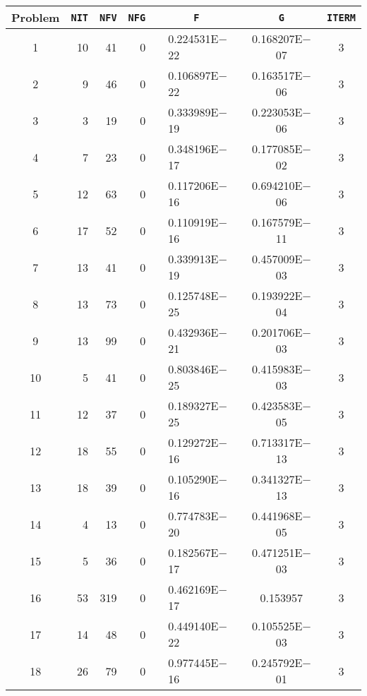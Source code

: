 \documentclass{esub2acm}
\begin{document}
\begin{table}
\footnotesize
\centering
\begin{tabular}{c|rrrr@{}lcc} \hline
Problem\rule[-2pt]{0pt}{12pt} & {\tt NIT} & {\tt NFV} & {\tt NFG} & \multicolumn{2}{c}{\tt F} & {\tt G} & {\tt ITERM} \\ \hline
1\rule[-2pt]{0pt}{12pt} &   10  &   41  &   0   &       &   0.224531E$-$22  &   0.168207E$-$07  &   3   \\
2   &   9   &   46  &   0   &       &   0.106897E$-$22  &   0.163517E$-$06  &   3   \\
3   &   3   &   19  &   0   &       &   0.333989E$-$19  &   0.223053E$-$06  &   3   \\
4   &   7   &   23  &   0   &       &   0.348196E$-$17  &   0.177085E$-$02  &   3   \\
5   &   12  &   63  &   0   &       &   0.117206E$-$16  &   0.694210E$-$06  &   3   \\
6   &   17  &   52  &   0   &       &   0.110919E$-$16  &   0.167579E$-$11  &   3   \\
7   &   13  &   41  &   0   &       &   0.339913E$-$19  &   0.457009E$-$03  &   3   \\
8   &   13  &   73  &   0   &       &   0.125748E$-$25  &   0.193922E$-$04  &   3   \\
9   &   13  &   99  &   0   &       &   0.432936E$-$21  &   0.201706E$-$03  &   3   \\
10  &   5   &   41  &   0   &       &   0.803846E$-$25  &   0.415983E$-$03  &   3   \\
11  &   12  &   37  &   0   &       &   0.189327E$-$25  &   0.423583E$-$05  &   3   \\
12  &   18  &   55  &   0   &       &   0.129272E$-$16  &   0.713317E$-$13  &   3   \\
13  &   18  &   39  &   0   &       &   0.105290E$-$16  &   0.341327E$-$13  &   3   \\
14  &   4   &   13  &   0   &       &   0.774783E$-$20  &   0.441968E$-$05  &   3   \\
15  &   5   &   36  &   0   &       &   0.182567E$-$17  &   0.471251E$-$03  &   3   \\
16  &   53  &   319 &   0   &       &   0.462169E$-$17  &   0.153957    &   3   \\
17  &   14  &   48  &   0   &       &   0.449140E$-$22  &   0.105525E$-$03  &   3   \\
18  &   26  &   79  &   0   &       &   0.977445E$-$16  &   0.245792E$-$01  &   3   \\

\end{tabular}
\end{table}
\end{document}
